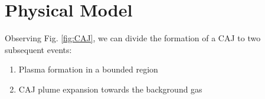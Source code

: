 \documentclass[a4paper]{iacas}%
\begin{document}
%
%
%
%
%

\section{Physical Model}\label{sec:physical_model}
Observing Fig. \ref{fig:CAJ}, we can divide the formation of a CAJ to two subsequent events:
\begin{enumerate}
	\item Plasma formation in a bounded region
	\item CAJ plume expansion towards the background gas
\end{enumerate}
\end{document}
